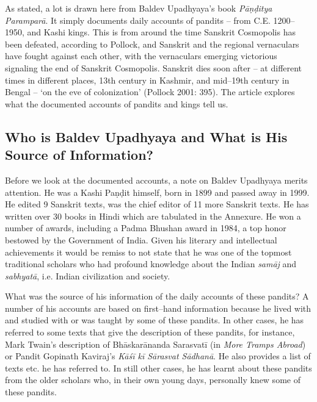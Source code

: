 As stated, a lot is drawn here from Baldev Upadhyaya’s book \textit{Pāṇḍitya Paramparā}. It simply documents daily accounts of pandits – from C.E. 1200–1950, and Kashi kings. This is from around the time Sanskrit Cosmopolis has been defeated, according to Pollock, and Sanskrit and the regional vernaculars have fought against each other, with the vernaculars emerging victorious signaling the end of Sanskrit Cosmopolis. Sanskrit dies soon after – at different times in different places, 13th century in Kashmir, and mid–19th century in Bengal – ‘on the eve of colonization’ (Pollock 2001: 395). The article explores what the documented accounts of pandits and kings tell us.

\subsection*{Who is Baldev Upadhyaya and What is His Source of Information?}

Before we look at the documented accounts, a note on Baldev Upadhyaya merits attention. He was a Kashi Paṇḍit himself, born in 1899 and passed away in 1999. He edited 9 Sanskrit texts, was the chief editor of 11 more Sanskrit texts. He has written over 30 books in Hindi which are tabulated in the Annexure. He won a number of awards, including a Padma Bhushan award in 1984, a top honor bestowed by the Government of India. Given his literary and intellectual achievements it would be remiss to not state that he was one of the topmost traditional scholars who had profound knowledge about the Indian \textit{samāj} and \textit{sabhyatā}, i.e. Indian civilization and society.

What was the source of his information of the daily accounts of these pandits? A number of his accounts are based on first–hand information because he lived with and studied with or was taught by some of these pandits. In other cases, he has referred to some texts that give the description of these pandits, for instance, Mark Twain’s description of Bhāskarānanda Sarasvatī (in \textit{More Tramps Abroad}) or Pandit Gopinath Kaviraj’s \textit{Kāśī kī Sārasvat Sādhanā}. He also provides a list of texts etc. he has referred to. In still other cases, he has learnt about these pandits from the older scholars who, in their own young days, personally knew some of these pandits.

